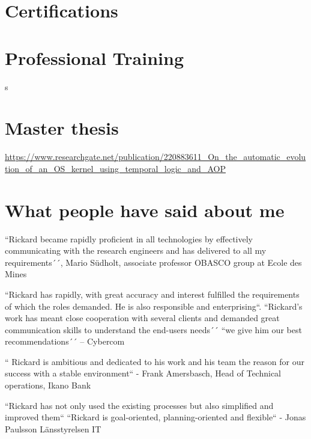 \documentclass[11pt,a4paper,sans]{moderncv}
\begin{document}
\section{Certifications}

\section{Professional Training}
s

\section{Master thesis}
\url{https://www.researchgate.net/publication/220883611\_On_the_automatic_evolution_of_an_OS_kernel_using_temporal_logic_and_AOP}

\section{What people have said about me}
\large 

\begin{quotelist}
    \item
    ``Rickard became rapidly proficient in all technologies by effectively communicating with the research engineers and has delivered to all my requirements´´,
      Mario Südholt, associate professor OBASCO group at Ecole des Mines 
\item
        ``Rickard has rapidly, with great accuracy and interest fulfilled the requirements of which the roles demanded.  He is also responsible and enterprising``. ``Rickard’s work has meant close cooperation with several clients and demanded great communication skills to understand the end-users needs´´ 
        ``we give him our best recommendations´´ – Cybercom 
\item     
        `` Rickard is ambitious and dedicated to his work and his team the reason for our success with a stable environment``  - Frank Amersbasch, Head of Technical operations, Ikano Bank 
\item  ``Rickard has not only used the existing processes but also simplified and improved them`` ``Rickard is goal-oriented, planning-oriented and flexible``  - Jonas Paulsson Länsstyrelsen IT 
       
  \end{quotelist}
\end{document}
